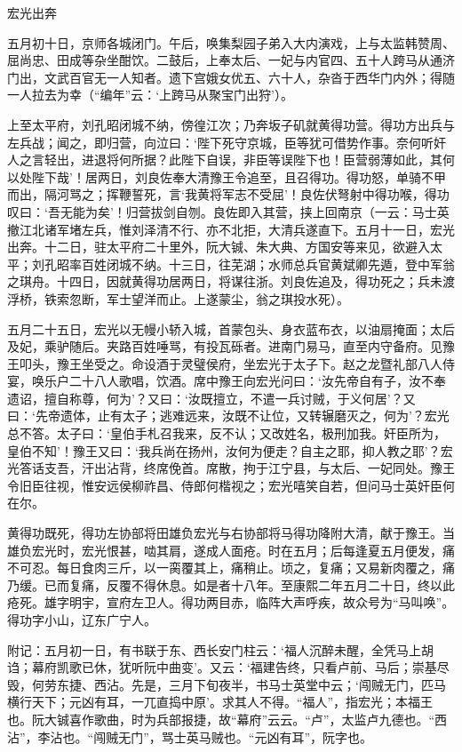 \documentclass[]{article}
\begin{document}
宏光出奔

五月初十日，京师各城闭门。午后，唤集梨园子弟入大内演戏，上与太监韩赞周、屈尚忠、田成等杂坐酣饮。二鼓后，上奉太后、一妃与内官四、五十人跨马从通济门出，文武百官无一人知者。遗下宫娥女优五、六十人，杂沓于西华门内外；得随一人拉去为幸（``编年''云：`上跨马从聚宝门出狩'）。

上至太平府，刘孔昭闭城不纳，傍徨江次；乃奔坂子矶就黄得功营。得功方出兵与左兵战；闻之，即归营，向泣曰：`陛下死守京城，臣等犹可借势作事。奈何听奸人之言轻出，进退将何所据？此陛下自误，非臣等误陛下也！臣营弱薄如此，其何以处陛下哉'！居两日，刘良佐奉大清豫王令追至，且召得功。得功怒，单骑不甲而出，隔河骂之；挥鞭誓死，言`我黄将军志不受屈'！良佐伏弩射中得功喉，得功叹曰：`吾无能为矣'！归营拔剑自刎。良佐即入其营，挟上回南京（一云：马士英撤江北诸军堵左兵，惟刘泽清不行、亦不北拒，大清兵遂直下。五月十一日，宏光出奔。十二日，驻太平府二十里外，阮大铖、朱大典、方国安等来见，欲避入太平；刘孔昭率百姓闭城不纳。十三日，往芜湖；水师总兵官黄斌卿先遁，登中军翁之琪舟。十四日，因就黄得功居两日，将谋往浙。刘良佐追及，得功死之；兵未渡浮桥，铁索忽断，军士望洋而止。上遂蒙尘，翁之琪投水死）。

五月二十五日，宏光以无幔小轿入城，首蒙包头、身衣蓝布衣，以油扇掩面；太后及妃，乘驴随后。夹路百姓唾骂，有投瓦砾者。进南门易马，直至内守备府。见豫王叩头，豫王坐受之。命设酒于灵璧侯府，坐宏光于太子下。赵之龙暨礼部八人侍宴，唤乐户二十八人歌唱，饮酒。席中豫王向宏光问曰：`汝先帝自有子，汝不奉遗诏，擅自称尊，何为'？又曰：`汝既擅立，不遣一兵讨贼，于义何居'？又曰：`先帝遗体，止有太子；逃难远来，汝既不让位，又转辗磨灭之，何为'？宏光总不答。太子曰：`皇伯手札召我来，反不认；又改姓名，极刑加我。奸臣所为，皇伯不知'！豫王又曰：`我兵尚在扬州，汝何为便走？自主之耶，抑人教之耶'？宏光答话支吾，汗出沾背，终席俛首。席散，拘于江宁县，与太后、一妃同处。豫王令旧臣往视，惟安远侯柳祚昌、侍郎何楷视之；宏光嘻笑自若，但问马士英奸臣何在尔。

黄得功既死，得功左协部将田雄负宏光与右协部将马得功降附大清，献于豫王。当雄负宏光时，宏光恨甚，啮其肩，遂成人面疮。时在五月；后每逢夏五月便发，痛不可忍。每日食肉三斤，以一脔覆其上，痛稍止。顷之，复痛；又易新肉覆之，痛乃缓。已而复痛，反覆不得休息。如是者十八年。至康熙二年五月二十日，终以此疮死。雄字明宇，宣府左卫人。得功两目赤，临阵大声呼疾，故众号为``马叫唤''。得功字小山，辽东广宁人。

附记：五月初一日，有书联于东、西长安门柱云：`福人沉醉未醒，全凭马上胡诌；幕府凯歌已休，犹听阮中曲变'。又云：`福建告终，只看卢前、马后；崇基尽毁，何劳东捷、西沾。先是，三月下旬夜半，书马士英堂中云；`闯贼无门，匹马横行天下；元凶有耳，一兀直捣中原'。求其人不得。``福人''，指宏光；本福王也。阮大铖喜作歌曲，时为兵部报捷，故``幕府''云云。``卢''，太监卢九德也。``西沾''，李沾也。``闯贼无门''，骂士英马贼也。``元凶有耳''，阮字也。
\end{document}
